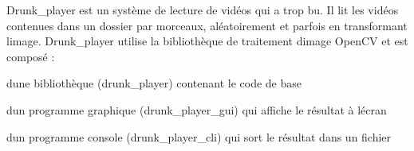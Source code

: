 Drunk\+\_\+player est un système de lecture de vidéos qui a trop bu. Il lit les vidéos contenues dans un dossier par morceaux, aléatoirement et parfois en transformant l\textquotesingle{}image. Drunk\+\_\+player utilise la bibliothèque de traitement d\textquotesingle{}image Open\+CV et est composé \+:
\begin{DoxyItemize}
\item d\textquotesingle{}une bibliothèque (drunk\+\_\+player) contenant le code de base
\item d\textquotesingle{}un programme graphique (drunk\+\_\+player\+\_\+gui) qui affiche le résultat à l\textquotesingle{}écran
\item d\textquotesingle{}un programme console (drunk\+\_\+player\+\_\+cli) qui sort le résultat dans un fichier 
\end{DoxyItemize}